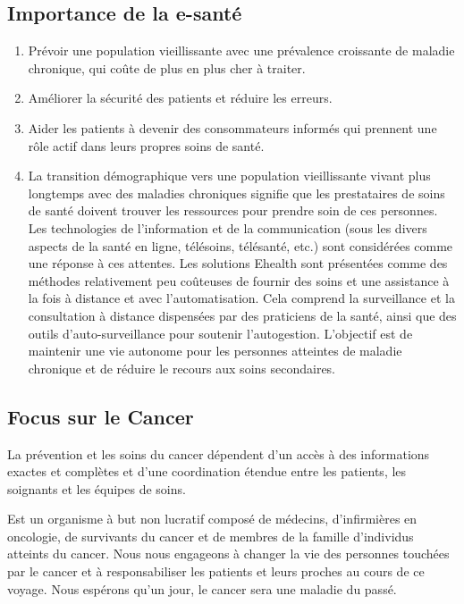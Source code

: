\documentclass[12pt]{article}
\begin{document}
\subsection{Importance de la e-santé}
\begin{enumerate}
	\item Prévoir une population vieillissante avec une prévalence croissante de maladie chronique, qui coûte de plus en plus cher à traiter.
	\item Améliorer la sécurité des patients et réduire les erreurs.
	\item Aider les patients à devenir des consommateurs informés qui prennent une rôle actif dans leurs propres soins de santé.
	\item La transition démographique vers une population vieillissante vivant plus longtemps avec des maladies chroniques signifie que les prestataires de soins de santé doivent trouver les ressources pour prendre soin de ces personnes. Les technologies de l’information et de la communication (sous les divers aspects de la santé en ligne, télésoins, télésanté, etc.) sont considérées comme une réponse à ces attentes. Les solutions Ehealth sont présentées comme des méthodes relativement peu coûteuses de fournir des soins et une assistance à la fois à distance et avec l’automatisation. Cela comprend la surveillance et la consultation à distance dispensées par des praticiens de la santé, ainsi que des outils d'auto-surveillance pour soutenir l'autogestion. L’objectif est de maintenir une vie autonome pour les personnes atteintes de maladie chronique et de réduire le recours aux soins secondaires.
\end{enumerate}

\subsection{Focus sur le Cancer}
La prévention et les soins du cancer dépendent d'un accès à des informations exactes et complètes et d'une coordination étendue entre les patients, les soignants et les équipes de soins.

Est un organisme à but non lucratif composé de médecins, d'infirmières en oncologie, de survivants du cancer et de membres de la famille d'individus atteints du cancer. Nous nous engageons à changer la vie des personnes touchées par le cancer et à responsabiliser les patients et leurs proches au cours de ce voyage. Nous espérons qu'un jour, le cancer sera une maladie du passé.
\end{document}
